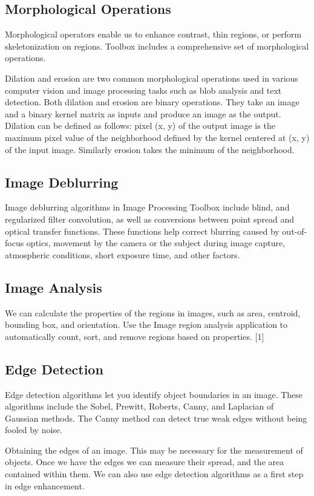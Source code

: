 \documentclass[a4paper,10pt]{article}
\begin{document}
\subsection{Morphological Operations}
Morphological operators enable us to enhance contrast, thin regions, or perform skeletonization on regions. Toolbox includes a comprehensive set of morphological operations.

Dilation and erosion are two common morphological operations used in various computer vision and image processing tasks such as blob analysis and text detection. Both dilation and erosion are binary operations. They take an image and a binary kernel matrix as inputs and produce an image as the output. Dilation can be defined as follows: pixel (x, y) of the output image is the maximum pixel value of the neighborhood defined by the kernel centered at (x, y) of the input image. Similarly erosion takes the minimum of the neighborhood.
\subsection{Image Deblurring}
Image deblurring algorithms in Image Processing Toolbox include blind, and regularized filter convolution, as well as conversions between point spread and optical transfer functions. These functions help correct blurring caused by out-of-focus optics, movement by the camera or the subject during image capture, atmospheric conditions, short exposure time, and other factors.
\subsection{Image Analysis}
We can calculate the properties of the regions in images, such as area, centroid, bounding box, and orientation. Use the Image region analysis application to automatically count, sort, and remove regions based on properties. [1]
\subsection{Edge Detection}
Edge detection algorithms let you identify object boundaries in an image. These algorithms include the Sobel, Prewitt, Roberts, Canny, and Laplacian of Gaussian methods. The Canny method can detect true weak edges without being fooled by noise.

Obtaining the edges of an image. This may be necessary for the measurement of objects. Once we have the edges we can measure their spread, and the area contained within them. We can also use edge detection algorithms as a first step in edge enhancement.
\end{document}
